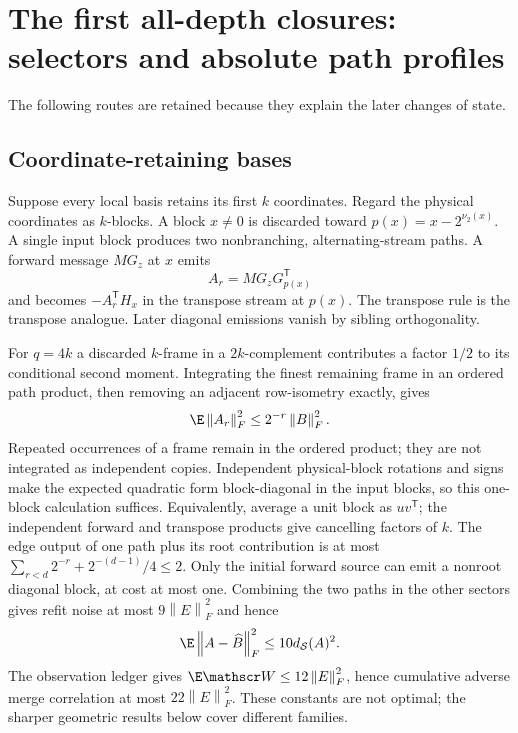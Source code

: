 \documentclass[11pt,oneside,openany,a4paper]{book}
\numberwithin{equation}{chapter}
\theoremstyle{definition}
\theoremstyle{remark}
\newcommand{\T}{\mathsf T}\newcommand{\Id}{I}
\newcommand{\F}[1]{\left\lVert#1\right\rVert_F}
\begin{document}
\section{The first all-depth closures: selectors and absolute path profiles}\label{base:new:early}
The following routes are retained because they explain the later changes of state.

\subsection{Coordinate-retaining bases}
Suppose every local basis retains its first $k$ coordinates. Regard the physical coordinates as $k$-blocks. A block $x\ne0$ is discarded toward $p(x)=x-2^{\nu_2(x)}$. A single input block produces two nonbranching, alternating-stream paths. A forward message $MG_z$ at $x$ emits
\[
 A_r=MG_zG_{p(x)}^\T
\]
and becomes $-A_r^\T H_x$ in the transpose stream at $p(x)$. The transpose rule is the transpose analogue. Later diagonal emissions vanish by sibling orthogonality.

For $q=4k$ a discarded $k$-frame in a $2k$-complement contributes a factor $1/2$ to its conditional second moment. Integrating the finest remaining frame in an ordered path product, then removing an adjacent row-isometry exactly, gives
\[
 \E\F{A_r}^2\le2^{-r}\F B^2.
\]
Repeated occurrences of a frame remain in the ordered product; they are not integrated as independent copies. Independent physical-block rotations and signs make the expected quadratic form block-diagonal in the input blocks, so this one-block calculation suffices. Equivalently, average a unit block as $uv^\T$; the independent forward and transpose products give cancelling factors of $k$.
The edge output of one path plus its root contribution is at most
$\sum_{r<d}2^{-r}+2^{-(d-1)}/4\le2$. Only the initial forward source can emit a nonroot diagonal block, at cost at most one. Combining the two paths in the other sectors gives refit noise at most $9\F E^2$ and hence
\begin{equation}\label{base:new:selector}
 \E\F{A-\widehat B}^2\le10d_{\mathcal S}(A)^2.
\end{equation}
The observation ledger gives $\E\mathscr W\le12\F E^2$, hence cumulative adverse merge correlation at most $22\F E^2$. These constants are not optimal; the sharper geometric results below cover different families.
\end{document}
